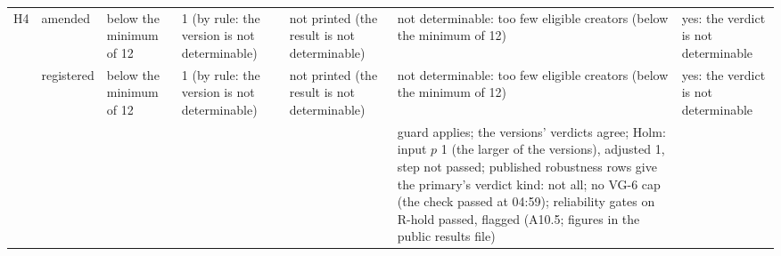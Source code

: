 {\begin{tabular}{@{}p{}p{}p{}p{}p{}p{}p{}@{}}
\midrule
H4 & amended & below the minimum of 12 & 1 (by rule: the version is not determinable) & not printed (the result is not determinable) & not determinable: too few eligible creators (below the minimum of 12) & yes: the verdict is not determinable \\
 & registered & below the minimum of 12 & 1 (by rule: the version is not determinable) & not printed (the result is not determinable) & not determinable: too few eligible creators (below the minimum of 12) & yes: the verdict is not determinable \\
 &  &  &  &  & guard applies; the versions' verdicts agree; Holm: input $p$ 1 (the larger of the versions), adjusted 1, step not passed; published robustness rows give the primary's verdict kind: not all; no VG-6 cap (the check passed at 04:59); reliability gates on R-hold passed, flagged (A10.5; figures in the public results file) &  \\
\bottomrule
\end{tabular}}
